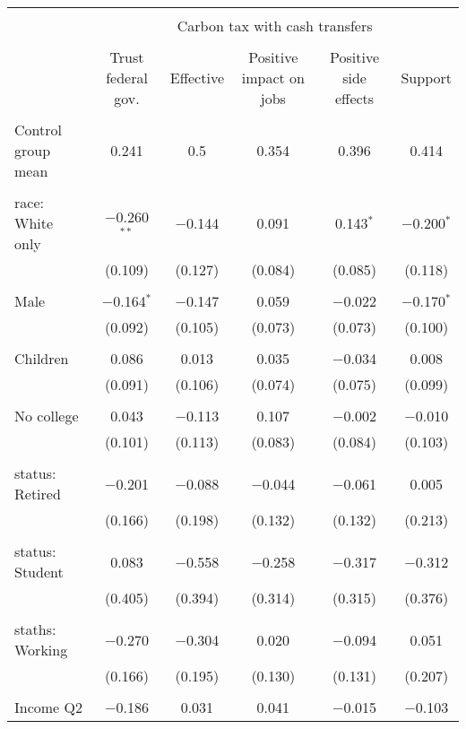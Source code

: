 
\begin{tabular}{@{\extracolsep{5pt}}lccccc} 
\\[-1.8ex]\hline 
\hline \\[-1.8ex] 
 & \multicolumn{5}{c}{Carbon tax with cash transfers} \\ 
\cline{2-6} 
\\[-1.8ex] & Trust federal gov. & Effective & Positive impact on jobs & Positive side effects & Support \\ 
\hline \\[-1.8ex] 
 Control group mean & 0.241 & 0.5 & 0.354 & 0.396 & 0.414  \\ \hline \\[-1.8ex] race: White only & $-$0.260$^{**}$ & $-$0.144 & 0.091 & 0.143$^{*}$ & $-$0.200$^{*}$ \\ 
  & (0.109) & (0.127) & (0.084) & (0.085) & (0.118) \\ 
  & & & & & \\ 
 Male & $-$0.164$^{*}$ & $-$0.147 & 0.059 & $-$0.022 & $-$0.170$^{*}$ \\ 
  & (0.092) & (0.105) & (0.073) & (0.073) & (0.100) \\ 
  & & & & & \\ 
 Children & 0.086 & 0.013 & 0.035 & $-$0.034 & 0.008 \\ 
  & (0.091) & (0.106) & (0.074) & (0.075) & (0.099) \\ 
  & & & & & \\ 
 No college & 0.043 & $-$0.113 & 0.107 & $-$0.002 & $-$0.010 \\ 
  & (0.101) & (0.113) & (0.083) & (0.084) & (0.103) \\ 
  & & & & & \\ 
 status: Retired & $-$0.201 & $-$0.088 & $-$0.044 & $-$0.061 & 0.005 \\ 
  & (0.166) & (0.198) & (0.132) & (0.132) & (0.213) \\ 
  & & & & & \\ 
 status: Student & 0.083 & $-$0.558 & $-$0.258 & $-$0.317 & $-$0.312 \\ 
  & (0.405) & (0.394) & (0.314) & (0.315) & (0.376) \\ 
  & & & & & \\ 
 staths: Working & $-$0.270 & $-$0.304 & 0.020 & $-$0.094 & 0.051 \\ 
  & (0.166) & (0.195) & (0.130) & (0.131) & (0.207) \\ 
  & & & & & \\ 
 Income Q2 & $-$0.186 & 0.031 & 0.041 & $-$0.015 & $-$0.103 \\ 

\end{tabular}
